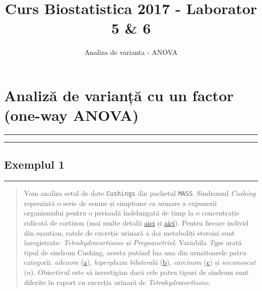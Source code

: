 \documentclass[]{article}
\title{Curs Biostatistica 2017 - Laborator 5 \& 6}
\subtitle{Analiza de varianta - ANOVA}
\author{}
\date{}
\begin{document}
\maketitle

{
\setcounter{tocdepth}{2}
\tableofcontents
}
\section{Analiză de varianță cu un factor (one-way
ANOVA)}\label{analiza-de-varianta-cu-un-factor-one-way-anova}

\begin{center}\rule{0.5\linewidth}{\linethickness}\end{center}

\begin{center}\rule{0.5\linewidth}{\linethickness}\end{center}

\subsection{Exemplul 1}\label{exemplul-1}

\begin{center}\rule{0.5\linewidth}{\linethickness}\end{center}

\begin{quote}
Vom analiza setul de date \texttt{Cushings} din pachetul \texttt{MASS}.
Sindromul \emph{Cushing} reprezintă o serie de semne și simptome ca
urmare a expunerii organismului pentru o perioadă îndelungată de timp la
o concentrație ridicată de cortizon (mai multe detalii
\href{http://www.csid.ro/boli-afectiuni/endocrinologie/sindromul-cushing-12821884/}{aici}
și \href{https://en.wikipedia.org/wiki/Cushing\%27s_syndrome}{aici}).
Pentru fiecare individ din eșantion, ratele de excreție urinară a doi
metaboliți steroizi sunt înregistrate: \emph{Tetrahydrocortisone} și
\emph{Pregnanetriol}. Variabila \emph{Type} arată tipul de sindrom
Cushing, acesta putând lua una din următoarele patru categorii:
\emph{adenom}
(\href{http://www.sfatulmedicului.ro/dictionar-medical/adenom_119}{a}),
\emph{hiperplazia bilaterală}
(\href{http://www.sfatulmedicului.ro/Afectiunile-suprarenalelor/hiperplazia-congenitala-a-glandelor-suprarenale_8123}{b}),
\emph{carcinom}
(\href{http://www.sfatulmedicului.ro/Cancer/ce-este-carcinomul_15473}{c})
și \emph{necunoscut} (u). Obiectivul este să investigăm dacă cele patru
tipuri de sindrom sunt diferite în raport cu excreția urinară de
\emph{Tetrahydrocortisone}.
\end{quote}
\end{document}
